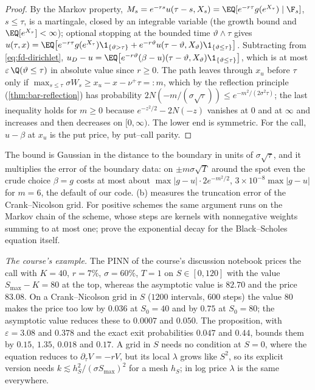 \begin{proof}
By the Markov property, $M_s=e^{-rs}u(\tau-s,X_s)=\EQ[e^{-r\tau}g(e^{X_\tau})\mid\F_s]$, $s\le\tau$, is a
martingale, closed by an integrable variable (the growth bound and $\EQ[e^{X_\tau}]<\infty$); optional
stopping at the bounded time $\vartheta\wedge\tau$ gives
$u(\tau,x)=\EQ\big[e^{-r\tau}g(e^{X_\tau})\1_{\{\vartheta>\tau\}}+e^{-r\vartheta}u(\tau-\vartheta,X_\vartheta)\1_{\{\vartheta\le\tau\}}\big]$. Subtracting from
\eqref{eq:fd-dirichlet}, $u_D-u=\EQ\big[e^{-r\vartheta}(\beta-u)(\tau-\vartheta,X_\vartheta)\1_{\{\vartheta\le\tau\}}\big]$, which is at most
$\varepsilon\,\Q(\vartheta\le\tau)$ in absolute value since $r\ge0$. The path leaves through $x_u$ before $\tau$ only if
$\max_{s\le\tau}\sigma W_s\ge x_u-x-\nu^+\tau=:m$, which by the reflection principle
(\cref{thm:bar-reflection}) has probability $2N(-m/(\sigma\sqrt\tau))\le e^{-m^2/(2\sigma^2\tau)}$; the last
inequality holds for $m\ge0$ because $e^{-z^2/2}-2N(-z)$ vanishes at $0$ and at $\infty$ and increases and
then decreases on $[0,\infty)$. The lower end is symmetric. For the call, $u-\beta$ at $x_u$ is the put
price, by put--call parity.
\end{proof}

The bound is Gaussian in the distance to the boundary in units of $\sigma\sqrt\tau$, and it multiplies
the error of the boundary data: on $\pm m\sigma\sqrt T$ around the spot even the crude choice $\beta=g$
costs at most about $\max|g-u|\cdot2e^{-m^2/2}$, $3\times10^{-8}\max|g-u|$ for $m=6$, the default of our code.
(b) measures the truncation error of the Crank--Nicolson grid. For positive
schemes the same argument runs on the Markov chain of the scheme, whose steps are kernels with
nonnegative weights summing to at most one; \textcite{kangro-nicolaides-2000} prove the
exponential decay for the Black--Scholes equation itself.

\emph{The course's example.} The PINN of the course's discussion notebook prices the call with
$K=40$, $r=7\%$, $\sigma=60\%$, $T=1$ on $S\in[0,120]$ with the value $S_{\max}-K=80$ at the top, whereas the
asymptotic value is $82.70$ and the price $83.08$. On a Crank--Nicolson grid in $S$ ($1200$ intervals,
$600$ steps) the value $80$ makes the price too low by $0.036$ at $S_0=40$ and by $0.75$ at $S_0=80$; the
asymptotic value reduces these to $0.0007$ and $0.050$. The proposition, with $\varepsilon=3.08$ and $0.378$
and the exact exit probabilities $0.047$ and $0.44$, bounds them by $0.15$, $1.35$, $0.018$ and $0.17$.
A grid in $S$ needs no condition at $S=0$, where the equation reduces to $\partial_\tau V=-rV$, but its
local $\lambda$ grows like $S^2$, so its explicit version needs $k\lesssim h_S^2/(\sigma S_{\max})^2$ for a mesh $h_S$; in log
price $\lambda$ is the same everywhere.

